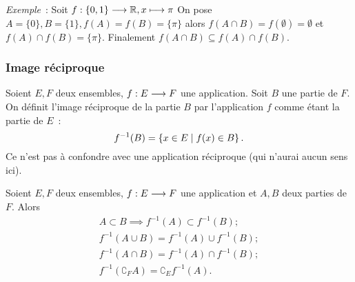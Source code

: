 \emph{Exemple}~: Soit \(f:\{0,1\} \longrightarrow{} \mathbb{R}, x \longmapsto{} \pi\) On pose \(A = \{0\},
B = \{1\}, f(A) = f(B) = \{\pi\}\) alors \(f(A \cap B) = f(\emptyset) =
\emptyset\) et \(f(A) \cap f(B) = \{\pi\}\). Finalement \(f(A \cap B) \subseteq
f(A) \cap f(B)\).

\subsubsection{Image réciproque}\label{chap3-subsubsec:imagereciproque}

\begin{defdef}
  Soient \(E, F\) deux ensembles, \(f:E \longrightarrow{} F\) une application. Soit
  \(B\) une partie de \(F\). On définit l'image réciproque de la partie \(B\)
  par l'application \(f\) comme étant la partie de \(E\)~:
  \begin{equation}
    f^{-1}(B) = \left\{x \in{}E\mathrel{}\middle|\mathrel{}f(x) \in{}B\right\}.
  \end{equation}
  Ce n'est pas à confondre avec une application réciproque (qui n'aurai aucun
  sens ici).
\end{defdef}

\begin{prop}
  Soient \(E, F\) deux ensembles, \(f:E \longrightarrow{} F\) une application et
  \(A,B\) deux parties de \(F\). Alors
  \begin{gather}
    A \subset{}B \implies f^{-1}(A) \subset{}f^{-1}(B);\\
    f^{-1}(A \cup B) = f^{-1}(A) \cup f^{-1}(B);\\
    f^{-1}(A \cap B) = f^{-1}(A) \cap f^{-1}(B);\\
    f^{-1}(\complement_F A) = \complement_E f^{-1}(A).
  \end{gather}
\end{prop}

